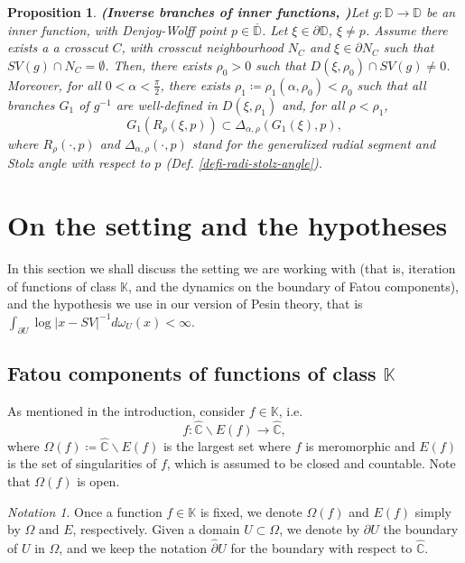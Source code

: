 \documentclass[11pt]{article}
\newtheorem{prop}[thm]{Proposition}
\theoremstyle{definition}
\theoremstyle{remark}
\newtheorem*{notation*}{Notation}
\newcounter{main}
\theoremstyle{plain}
\begin{document}
\begin{prop}{\bf (Inverse branches of inner functions, {\normalfont\cite[Prop. 4.5]{Jove}})}\label{prop-radial-limits}
	Let $ g\colon\mathbb{D}\to\mathbb{D} $ be an inner function, with Denjoy-Wolff point $ p\in\overline{\mathbb{D}} $. Let $ \xi\in\partial\mathbb{D} $, $ \xi\neq p $.
	Assume there exists a a crosscut $ C $, with crosscut neighbourhood $ N_C $ and $ \xi\in \partial N_C $ such that $ SV(g)\cap N_C =\emptyset$. Then, there exists $ \rho_0>0$ such that $ D(\xi, \rho_0)\cap SV(g)\neq 0 $.  Moreover, for all $ 0<\alpha< \frac{\pi}{2}$, there exists $ \rho_1\coloneqq \rho_1(\alpha, \rho_0)<\rho_0 $ such that all branches $ G_1 $ of $ g^{-1} $ are well-defined in $ D(\xi, \rho_1) $ and, for all $ \rho<\rho_1 $,\[G_1(R_\rho(\xi, p))\subset \Delta_{\alpha,\rho}(G_1(\xi), p),\] where $ R_\rho(\cdot, p) $ and $ \Delta_{\alpha,\rho}(\cdot, p) $ stand for the generalized radial segment and Stolz angle with respect to $ p $ {\em (Def. \ref{defi-radi-stolz-angle})}. 
\end{prop}




\section{On the setting and the hypotheses}\label{sect3-setting}
In this section we shall discuss the setting we are working with (that is, iteration of functions of class $ \mathbb{K} $, and the dynamics on the boundary of Fatou components), and the hypothesis we use in our version of Pesin theory, that is  $ \int_{\partial U} \log\left| x-SV\right|^{-1} d\omega_U(x)<\infty  $. 
\subsection{Fatou components of functions of class $ \mathbb{K} $}\label{subsect-components-Fatou-K}

As mentioned in the introduction, consider $ f\in\mathbb{K} $, i.e. \[f\colon \widehat{\mathbb{C}}\smallsetminus E(f)\to \widehat{\mathbb{C}},\] where $ \Omega(f)\coloneqq\widehat{\mathbb{C}}\smallsetminus E(f)  $ is the largest set where $ f $ is meromorphic and $ E(f) $ is the set of singularities of $ f $, which is assumed to be closed and countable. Note that $ \Omega(f)$ is open. 

\begin{notation*}
	Once a function $ f\in\mathbb{K} $ is fixed, we denote $ \Omega(f) $ and $ E(f) $ simply by $ \Omega $ and $ E $, respectively. Given a domain $ U\subset\Omega $, we denote by $ \partial U $ the boundary of $ U $ in $ \Omega $, and we keep the notation $ \widehat{\partial} U $ for the boundary with respect to $ \widehat{\mathbb{C}} $.
\end{notation*}
\end{document}
